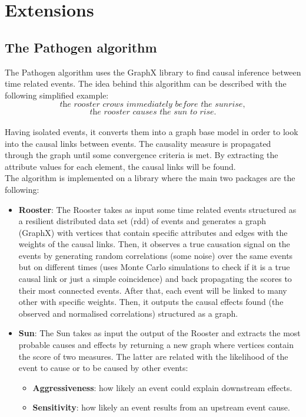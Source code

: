 \documentclass[a4, 11pt]{article}
\begin{document}
\section{Extensions}
\subsection{The Pathogen algorithm}
The Pathogen algorithm \cite{Pathogen} uses the GraphX library to find causal inference between time related events. The idea behind this algorithm can be described with the following simplified example: $$\textit{the rooster crows immediately before the sunrise},$$ $$\textit{the rooster causes the sun to rise.}$$\\
Having isolated events, it converts them into a graph base model in order to look into the causal links between events. The causality measure is propagated through the graph until some convergence criteria is met. By extracting the attribute values for each element, the causal links will be found. \\
The algorithm is implemented on a library where the main two packages are the following:
\begin{itemize}
    \item \textbf{Rooster}: The Rooster takes as input some time related events structured as a resilient distributed data set (rdd) of events and generates a graph (GraphX) with vertices that contain specific attributes and edges with the weights of the causal links. Then, it observes a true causation signal on the events by generating random correlations (some noise) over the same events but on different times (uses Monte Carlo simulations to check if it is a true causal link or just a simple coincidence) and back propagating the scores to their most connected events.
    After that, each event will be linked to many other with specific weights. 
    Then, it outputs the causal effects found (the observed and normalised correlations) structured as a graph.
  
    \item \textbf{Sun}: The Sun takes as input the output of the Rooster and extracts the most probable causes and effects by returning a new graph where vertices contain the score of two measures. The latter are related with the likelihood of the event to cause or to be caused by other events:

    
    \begin{itemize}
        \item \textbf{Aggressiveness}: how likely an event could explain downstream effects.
        \item \textbf{Sensitivity}: how likely an event results from an upstream event cause.
    \end{itemize}
    \end{itemize}
\end{document}
